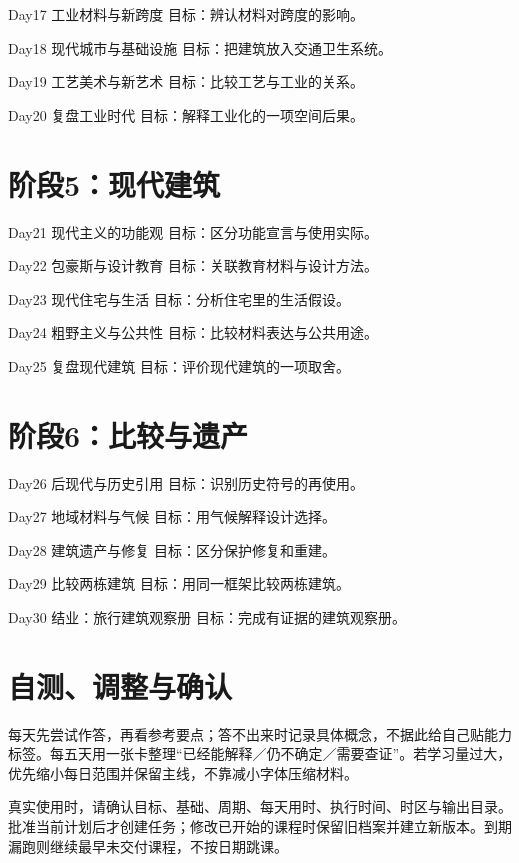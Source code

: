\documentclass[11pt]{article}
\newcommand{\Needspace}[1]{\par\ifdim\dimexpr\pagegoal-\pagetotal\relax<#1\relax\newpage\fi}
\begin{document}
Day17  工业材料与新跨度
目标：辨认材料对跨度的影响。

Day18  现代城市与基础设施
目标：把建筑放入交通卫生系统。

Day19  工艺美术与新艺术
目标：比较工艺与工业的关系。

Day20  复盘工业时代
目标：解释工业化的一项空间后果。

\Needspace{5\baselineskip}\section*{阶段5：现代建筑}

Day21  现代主义的功能观
目标：区分功能宣言与使用实际。

Day22  包豪斯与设计教育
目标：关联教育材料与设计方法。

Day23  现代住宅与生活
目标：分析住宅里的生活假设。

Day24  粗野主义与公共性
目标：比较材料表达与公共用途。

Day25  复盘现代建筑
目标：评价现代建筑的一项取舍。

\Needspace{5\baselineskip}\section*{阶段6：比较与遗产}

Day26  后现代与历史引用
目标：识别历史符号的再使用。

Day27  地域材料与气候
目标：用气候解释设计选择。

Day28  建筑遗产与修复
目标：区分保护修复和重建。

Day29  比较两栋建筑
目标：用同一框架比较两栋建筑。

Day30  结业：旅行建筑观察册
目标：完成有证据的建筑观察册。

\Needspace{5\baselineskip}\section*{自测、调整与确认}

每天先尝试作答，再看参考要点；答不出来时记录具体概念，不据此给自己贴能力标签。每五天用一张卡整理“已经能解释／仍不确定／需要查证”。若学习量过大，优先缩小每日范围并保留主线，不靠减小字体压缩材料。

真实使用时，请确认目标、基础、周期、每天用时、执行时间、时区与输出目录。批准当前计划后才创建任务；修改已开始的课程时保留旧档案并建立新版本。到期漏跑则继续最早未交付课程，不按日期跳课。
\end{document}
